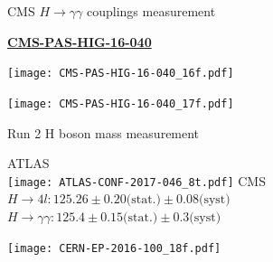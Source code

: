\begin{frame}{CMS $H\rightarrow \gamma\gamma$ couplings measurement}

  \begin{center} \href{https://cds.cern.ch/record/2264515}{\bf CMS-PAS-HIG-16-040} \end{center}
  
  \begin{minipage}{0.49\linewidth}
    \texttt{[image: CMS-PAS-HIG-16-040\_16f.pdf]}
  \end{minipage}
  \hfill
  \begin{minipage}{0.49\linewidth}
    \texttt{[image: CMS-PAS-HIG-16-040\_17f.pdf]}
    \end{minipage}
\end{frame}

\begin{frame}{Run 2 H boson mass measurement}
  \begin{minipage}{0.58\linewidth}
  \centering
    ATLAS\\
    \texttt{[image: ATLAS-CONF-2017-046\_8t.pdf]}
    \vfill
    CMS\\
    $H\rightarrow 4l : 125.26 \pm 0.20 \text{(stat.)} \pm 0.08 \text{(syst)}$ \\
    $H\rightarrow \gamma\gamma : 125.4 \pm 0.15 \text{(stat.)} \pm 0.3 \text{(syst)}$ \\
  \end{minipage}
  \hfill
  \begin{minipage}{0.41\linewidth}
    \texttt{[image: CERN-EP-2016-100\_18f.pdf]}
  \end{minipage}
\end{frame}
